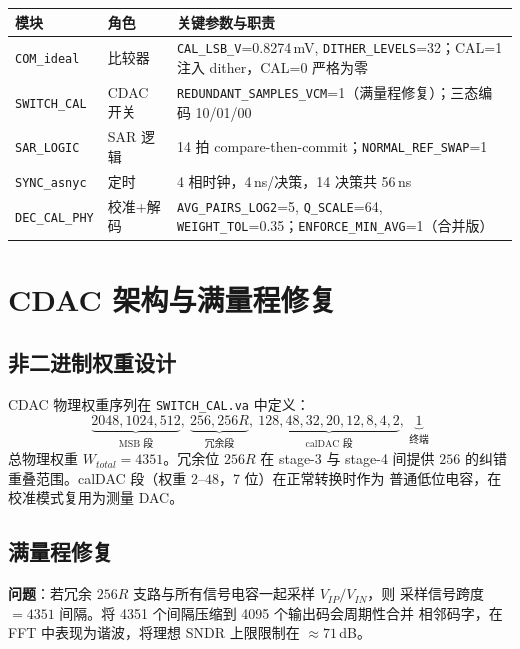 \documentclass[UTF8,a4paper,11pt,twoside]{ctexrep}
\begin{document}
\footnotesize
\begin{longtable}{p{3.2cm}p{2.0cm}p{8.5cm}}
\toprule
\textbf{模块} & \textbf{角色} & \textbf{关键参数与职责} \\
\hline
\endhead
\texttt{COM\_ideal} & 比较器 & \texttt{CAL\_LSB\_V}=0.8274\,mV, \texttt{DITHER\_LEVELS}=32；CAL=1 注入 dither，CAL=0 严格为零 \\
\texttt{SWITCH\_CAL} & CDAC 开关 & \texttt{REDUNDANT\_SAMPLES\_VCM}=1（满量程修复）；三态编码 10/01/00 \\
\texttt{SAR\_LOGIC} & SAR 逻辑 & 14 拍 compare-then-commit；\texttt{NORMAL\_REF\_SWAP}=1 \\
\texttt{SYNC\_asnyc} & 定时 & 4 相时钟，4\,ns/决策，14 决策共 56\,ns \\
\texttt{DEC\_CAL\_PHY} & 校准+解码 & \texttt{AVG\_PAIRS\_LOG2}=5, \texttt{Q\_SCALE}=64, \texttt{WEIGHT\_TOL}=0.35；\texttt{ENFORCE\_MIN\_AVG}=1（合并版） \\
\bottomrule
\end{longtable}

\chapter{CDAC 架构与满量程修复}

\section{非二进制权重设计}

CDAC 物理权重序列在 \texttt{SWITCH\_CAL.va} 中定义：
\[
\underbrace{2048,1024,512}_{\text{MSB 段}},\ 
\underbrace{256,256R}_{\text{冗余段}},\ 
\underbrace{128,48,32,20,12,8,4,2}_{\text{calDAC 段}},\ 
\underbrace{1}_{\text{终端}}
\]
总物理权重 $W_{total}=4351$。冗余位 $256R$ 在 stage-3 与 stage-4 间提供
$256$ 的纠错重叠范围。calDAC 段（权重 $2$--$48$，7 位）在正常转换时作为
普通低位电容，在校准模式复用为测量 DAC。

\section{满量程修复}

\textbf{问题}：若冗余 $256R$ 支路与所有信号电容一起采样 $V_{IP}/V_{IN}$，则
采样信号跨度 $=4351$ 间隔。将 4351 个间隔压缩到 4095 个输出码会周期性合并
相邻码字，在 FFT 中表现为谐波，将理想 SNDR 上限限制在 $\approx 71$\,dB。
\end{document}
